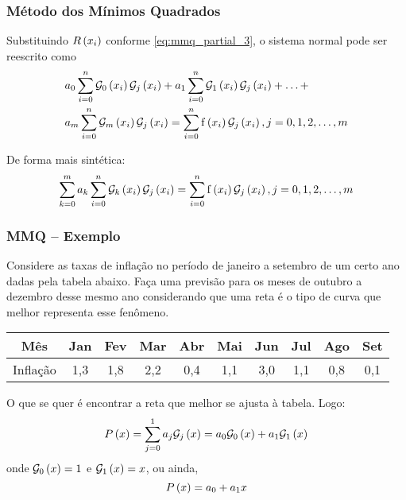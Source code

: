 \begin{frame}
\frametitle{Método dos Mínimos Quadrados}

Substituindo $R\left(x_i\right)$ conforme \cref{eq:mmq_partial_3}, o sistema normal pode ser reescrito como
\begin{align*}
&a_0 \sum_{i=0}^n \G_0\left(\x_i\right) \G_j\left(x_i\right) +
a_1 \sum_{i=0}^n \G_1\left(\x_i\right) \G_j\left(x_i\right) + \ldots +\\
%
&a_m \sum_{i=0}^n \G_m\left(\x_i\right) \G_j\left(x_i\right) =
\sum_{i=0}^n \f\left(\x_i\right) \G_j\left(x_i\right), j = 0,1,2,\ldots,m
\end{align*}%

De forma mais sintética:
\[
\sum_{k=0}^m a_k \sum_{i=0}^n \mathcal{G}_k\left(x_i\right) \mathcal{G}_j\left(x_i\right) = 
\sum_ {i=0}^n \mathrm{f} \left(x_i\right) \mathcal{G}_j\left(x_i\right), j = 0, 1, 2, \ldots, m
\]

\end{frame}

\begin{frame}
\frametitle{MMQ -- Exemplo}

Considere as taxas de inflação no período de janeiro a setembro de um certo ano dadas pela tabela abaixo. Faça uma previsão para os meses de outubro a dezembro desse mesmo ano considerando que uma reta é o tipo de curva que melhor representa esse fenômeno.

\begin{center}
\begin{tabular}{c|c|c|c|c|c|c|c|c|c}
Mês & Jan & Fev & Mar & Abr & Mai & Jun & Jul & Ago & Set\\
\hline
Inflação & 1,3 & 1,8 & 2,2 & 0,4 & 1,1 & 3,0 & 1,1 & 0,8 & 0,1
\end{tabular}
\end{center}

O que se quer é encontrar a reta que melhor se ajusta à tabela. Logo:
\[
P\left(x\right) = \sum_{j=0}^1 a_j \mathcal{G}_j\left(x\right) = 
a_0 \mathcal{G}_0 \left(x\right) + a_1 \mathcal{G}_1 \left(x\right)
\]
onde $\mathcal{G}_0\left(x\right) = 1$ e $\mathcal{G}_1\left(x\right) = x$,
ou ainda,
\[
P \left(x\right) = a_0 + a_1 x
\]

\end{frame}


